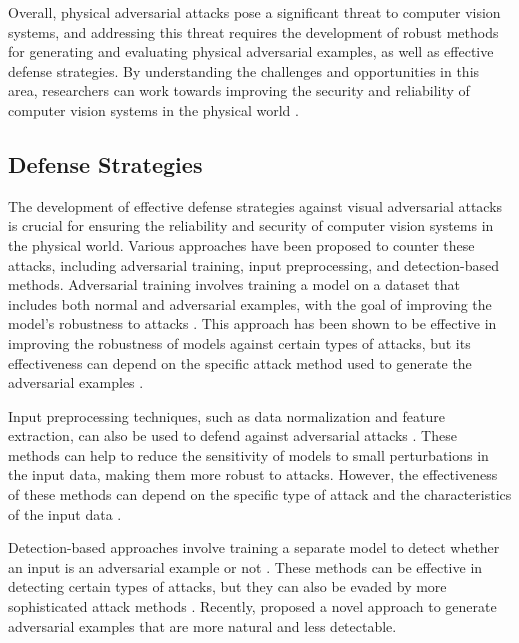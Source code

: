\documentclass[11pt,a4paper]{article}
\begin{document}
Overall, physical adversarial attacks pose a significant threat to computer vision systems, and addressing this threat requires the development of robust methods for generating and evaluating physical adversarial examples, as well as effective defense strategies. By understanding the challenges and opportunities in this area, researchers can work towards improving the security and reliability of computer vision systems in the physical world \cite{arxiv:1904.00759,arxiv:1910.11099,doi:10.1109/asp-dac47756.2020.9045584,doi:10.1145/3450267.3450535}.


\subsection{Defense Strategies}


The development of effective defense strategies against visual adversarial attacks is crucial for ensuring the reliability and security of computer vision systems in the physical world. Various approaches have been proposed to counter these attacks, including adversarial training, input preprocessing, and detection-based methods. Adversarial training involves training a model on a dataset that includes both normal and adversarial examples, with the goal of improving the model's robustness to attacks \cite{doi:10.1145/3128572.3140444}. This approach has been shown to be effective in improving the robustness of models against certain types of attacks, but its effectiveness can depend on the specific attack method used to generate the adversarial examples \cite{arxiv:1705.07204}.

Input preprocessing techniques, such as data normalization and feature extraction, can also be used to defend against adversarial attacks \cite{doi:10.1609/aaai.v32i1.11828}. These methods can help to reduce the sensitivity of models to small perturbations in the input data, making them more robust to attacks. However, the effectiveness of these methods can depend on the specific type of attack and the characteristics of the input data \cite{doi:10.1145/3274895.3274904}.

Detection-based approaches involve training a separate model to detect whether an input is an adversarial example or not \cite{doi:10.1109/tnnls.2021.3105238}. These methods can be effective in detecting certain types of attacks, but they can also be evaded by more sophisticated attack methods \cite{arxiv:1904.02884}. Recently, \cite{doi:10.1109/cvpr42600.2020.00108} proposed a novel approach to generate adversarial examples that are more natural and less detectable.
\end{document}
